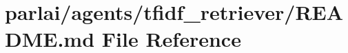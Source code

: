 \hypertarget{parlai_2agents_2tfidf__retriever_2README_8md}{}\section{parlai/agents/tfidf\+\_\+retriever/\+R\+E\+A\+D\+ME.md File Reference}
\label{parlai_2agents_2tfidf__retriever_2README_8md}
